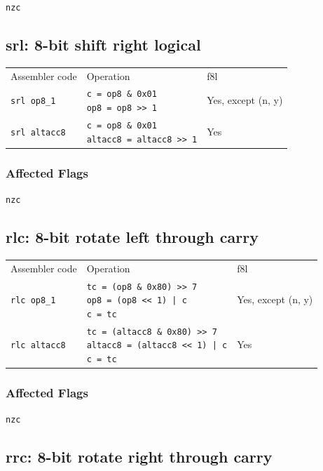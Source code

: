 \documentclass{book}
\begin{document}
\texttt{nzc}


\subsection{srl: 8-bit shift right logical}

\begin{tabular}{l l l}
Assembler code       & Operation                                                            & f8l \\
\texttt{srl op8\_1}  & \makecell{\texttt{c = op8 \& 0x01}\\\texttt{op8 = op8 >> 1}}         & Yes, except (n, y) \\
\texttt{srl altacc8} & \makecell{\texttt{c = op8 \& 0x01}\\\texttt{altacc8 = altacc8 >> 1}} & Yes
\end{tabular}

\subsubsection*{Affected Flags}

\texttt{nzc}


\subsection{rlc: 8-bit rotate left through carry}

\begin{tabular}{l l l}
Assembler code       & Operation                                                                                               & f8l \\
\texttt{rlc op8\_1}  & \makecell{\texttt{tc = (op8  \& 0x80) >> 7}\\\texttt{op8 = (op8 << 1) | c}\\\texttt{c = tc}}            & Yes, except (n, y) \\
\texttt{rlc altacc8} & \makecell{\texttt{tc = (altacc8 \& 0x80) >> 7}\\\texttt{altacc8 = (altacc8 << 1) | c}\\\texttt{c = tc}} & Yes
\end{tabular}

\subsubsection*{Affected Flags}

\texttt{nzc}


\subsection{rrc: 8-bit rotate right through carry}
\end{document}
